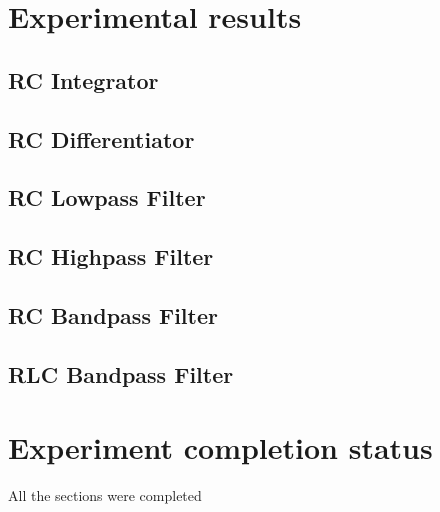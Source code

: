 \documentclass[12pt]{article}
\begin{document}
\section{Experimental results}

\subsection{RC Integrator}
\subsection{RC Differentiator}
\subsection{RC Lowpass Filter}
\subsection{RC Highpass Filter}
\subsection{RC Bandpass Filter}
\subsection{RLC Bandpass Filter}
\section{Experiment completion status}
All the sections were completed
\end{document}
